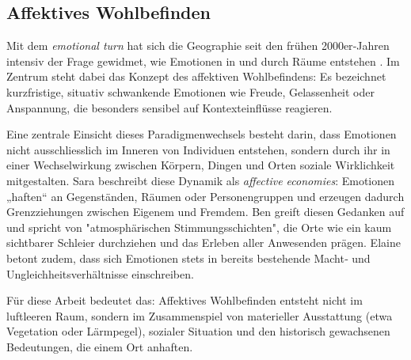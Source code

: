 \subsection{Affektives Wohlbefinden}

Mit dem \textit{emotional turn} hat sich die Geographie seit den frühen 2000er‑Jahren intensiv der Frage gewidmet, wie Emotionen in und durch Räume entstehen \parencite{hoSocialGeographyIII2024}. Im Zentrum steht dabei das Konzept des affektiven Wohlbefindens: Es bezeichnet kurzfristige, situativ schwankende Emotionen wie Freude, Gelassenheit oder Anspannung, die besonders sensibel auf Kontexteinflüsse reagieren. 

Eine zentrale Einsicht dieses Paradigmenwechsels besteht darin, dass Emotionen nicht ausschliesslich im Inneren von Individuen entstehen, sondern durch ihr in einer Wechselwirkung zwischen Körpern, Dingen und Orten soziale Wirklichkeit mitgestalten. Sara \textcite{ahmedAffectiveEconomies2004} beschreibt diese Dynamik als \emph{affective economies}: Emotionen „haften“ an Gegenständen, Räumen oder Personengruppen und erzeugen dadurch Grenzziehungen zwischen Eigenem und Fremdem. Ben \textcite{andersonAffectiveAtmospheres2009} greift diesen Gedanken auf und spricht von "atmosphärischen Stimmungsschichten", die Orte wie ein kaum sichtbarer Schleier durchziehen und das Erleben aller Anwesenden prägen. Elaine \textcite{hoSocialGeographyIII2024} betont zudem, dass sich Emotionen stets in bereits bestehende Macht‑ und Ungleichheitsverhältnisse einschreiben.

Für diese Arbeit bedeutet das: Affektives Wohlbefinden entsteht nicht im luftleeren Raum, sondern im Zusammenspiel von materieller Ausstattung (etwa Vegetation oder Lärmpegel), sozialer Situation und den historisch gewachsenen Bedeutungen, die einem Ort anhaften.


